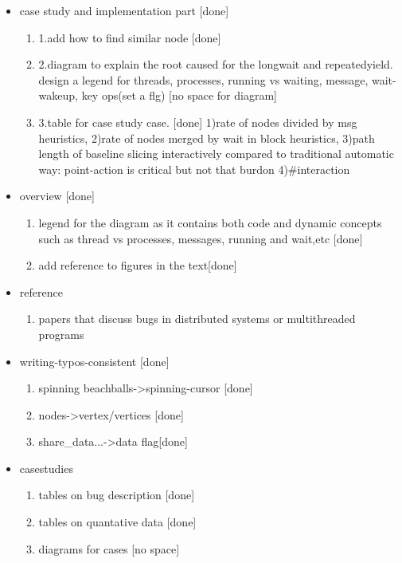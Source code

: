 \begin{itemize}

\item case study and implementation part [done]
	\begin{enumerate}
 	\item 1.add how to find similar node [done]
 	\item 2.diagram to explain the root caused for the longwait and repeatedyield. design a legend for threads, processes, running vs waiting, message, wait-wakeup, key ops(set a flg) [no space for diagram]
	\item 3.table for case study case. [done]
		1)rate of nodes divided by msg heuristics,
		2)rate of nodes merged by wait in block heuristics,
		3)path length of baseline slicing interactively compared to traditional automatic way: point-action is critical but not that burdon
        4)#interaction

	\end{enumerate}

\item overview [done]
	\begin{enumerate}
	\item legend for the diagram as it contains both code and dynamic concepts such as thread vs processes, messages, running and wait,etc [done]
    \item add reference to figures in the text[done]
	\end{enumerate}


\item reference
	\begin{enumerate}
	\item papers that discuss bugs in distributed systems or multithreaded programs
	\end{enumerate}

\item writing-typos-consistent [done]
	\begin{enumerate}
	\time command, variable names, etc should have \vv [done]
	\item spinning beachballs->spinning-cursor [done]
	\item nodes->vertex/vertices [done]
	\item share\_data...->data flag[done]
	\end{enumerate}

\item casestudies
	\begin{enumerate}
	\item tables on bug description [done]
	\item tables on quantative data [done]
	\item diagrams for cases [no space]
	\end{enumerate}

\end{itemize}
